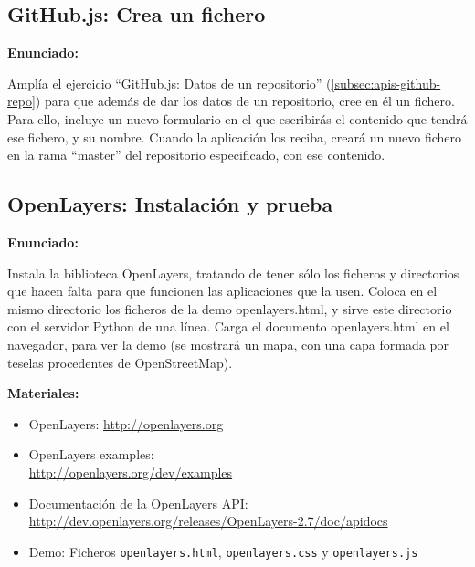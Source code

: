 \subsection{GitHub.js: Crea un fichero}
\label{subsec:apis-github-file}

\textbf{Enunciado:}

Amplía el ejercicio ``GitHub.js: Datos de un repositorio'' (\ref{subsec:apis-github-repo}) para que además de dar los datos de un repositorio, cree en él un fichero. Para ello, incluye un nuevo formulario en el que escribirás el contenido que tendrá ese fichero, y su nombre. Cuando la aplicación los reciba, creará un nuevo fichero en la rama ``master'' del repositorio especificado, con ese contenido.


\subsection{OpenLayers: Instalación y prueba}
\label{subsec:apis-openlayers-instal}

\textbf{Enunciado:}

Instala la biblioteca OpenLayers, tratando de tener sólo los ficheros y directorios que hacen falta para que funcionen las aplicaciones que la usen. Coloca en el mismo directorio los ficheros de la demo openlayers.html, y sirve este directorio con el servidor Python de una línea. Carga el documento openlayers.html en el navegador, para ver la demo (se mostrará un mapa, con una capa formada por teselas procedentes de OpenStreetMap).

\textbf{Materiales:}

\begin{itemize}
\item OpenLayers: \url{http://openlayers.org}
\item OpenLayers examples: \\
  \url{http://openlayers.org/dev/examples}
\item Documentación de la OpenLayers API: \\
  \url{http://dev.openlayers.org/releases/OpenLayers-2.7/doc/apidocs}
\item Demo: Ficheros \verb|openlayers.html|, \verb|openlayers.css| y \verb|openlayers.js|
\end{itemize}

